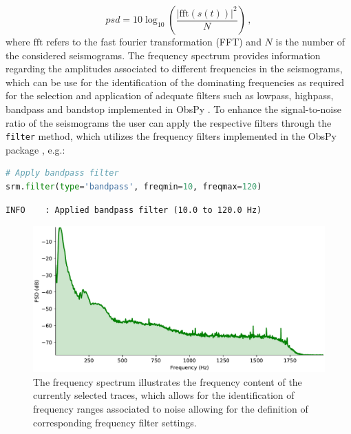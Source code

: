 \documentclass[a4paper,fleqn]{cas-sc}
\begin{document}
\begin{equation}
	psd=10\log_{10}\left(\frac{\lvert \textrm{fft}\left(s\left(t\right)\right)\rvert^2}{N}\right)\,,
\end{equation}
where $\textrm{fft}$ refers to the fast fourier transformation (FFT) and $N$ is the number of the considered seismograms.
The frequency spectrum provides information regarding the amplitudes associated to different frequencies in the seismograms, which can be use for the identification of the dominating frequencies as required for the selection and application of adequate filters such as lowpass, highpass, bandpass and bandstop implemented in ObsPy \citep{beyreuther2010}.
To enhance the signal-to-noise ratio of the seismograms the user can apply the respective filters through the \texttt{filter} method, which utilizes the frequency filters implemented in the ObsPy package \citep[lowpass, highpass, bandpass and bandstop;][]{beyreuther2010}, e.g.:
\begin{lstlisting}[language=Python, firstnumber=14]
# Apply bandpass filter
srm.filter(type='bandpass', freqmin=10, freqmax=120)
\end{lstlisting}
\begin{footnotesize}
\begin{verbatim}
INFO    : Applied bandpass filter (10.0 to 120.0 Hz)
\end{verbatim}
\end{footnotesize}
\begin{figure}
	\centering
	\includegraphics[width=.75\textwidth]{figures/spectrum.pdf}
	\caption{The frequency spectrum illustrates the frequency content of the currently selected traces, which allows for the identification of frequency ranges associated to noise allowing for the definition of corresponding frequency filter settings.}
	\label{fig:spectrum}
\end{figure}
\end{document}
